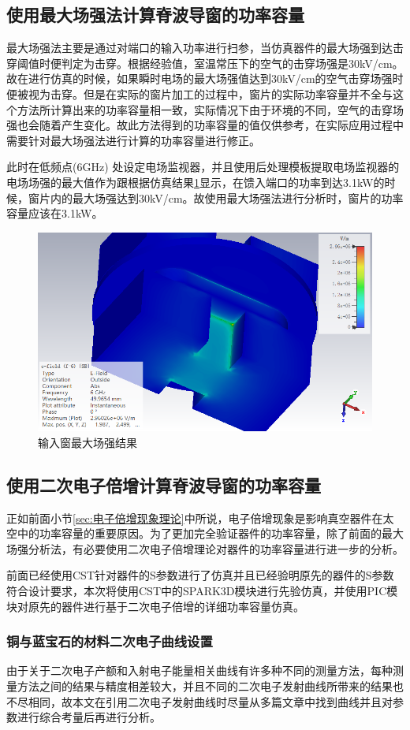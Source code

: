\documentclass[master]{thesis-uestc}
\begin{document}
\subsection{使用最大场强法计算脊波导窗的功率容量}\label{subsec:X最大场强功率容量}
最大场强法主要是通过对端口的输入功率进行扫参，当仿真器件的最大场强到达击穿阈值时便判定为击穿。根据经验值，室温常压下的空气的击穿场强是30kV/cm。故在进行仿真的时候，如果瞬时电场的最大场强值达到30kV/cm的空气击穿场强时便被视为击穿。但是在实际的窗片加工的过程中，窗片的实际功率容量并不全与这个方法所计算出来的功率容量相一致，实际情况下由于环境的不同，空气的击穿场强也会随着产生变化。故此方法得到的功率容量的值仅供参考，在实际应用过程中需要针对最大场强法进行计算的功率容量进行修正。

此时在低频点(6GHz) 处设定电场监视器，并且使用后处理模板提取电场监视器的电场场强的最大值作为跟根据仿真结果\ref{fig:输入窗最大场强结果}显示，在馈入端口的功率到达3.1kW的时候，窗片内的最大场强达到30kV/cm。故使用最大场强法进行分析时，窗片的功率容量应该在3.1kW。
\begin{figure}[!htb]
    \centering
    \includegraphics[width=0.5\linewidth]{pic/chapter3/X频段最大功率场强.png}
    \caption{输入窗最大场强结果}
    \label{fig:输入窗最大场强结果}
\end{figure}

\subsection{使用二次电子倍增计算脊波导窗的功率容量}\label{subsec:X二次电子倍增功率容量}
正如前面小节\ref{sec:电子倍增现象理论}中所说，电子倍增现象是影响真空器件在太空中的功率容量的重要原因。为了更加完全验证器件的功率容量，除了前面的最大场强分析法，有必要使用二次电子倍增理论对器件的功率容量进行进一步的分析。

前面已经使用CST针对器件的S参数进行了仿真并且已经验明原先的器件的S参数符合设计要求，本次将使用CST中的SPARK3D模块进行先验仿真，并使用PIC模块对原先的器件进行基于二次电子倍增的详细功率容量仿真。

\subsubsection{铜与蓝宝石的材料二次电子曲线设置}
由于关于二次电子产额和入射电子能量相关曲线有许多种不同的测量方法，每种测量方法之间的结果与精度相差较大，并且不同的二次电子发射曲线所带来的结果也不尽相同，故本文在引用二次电子发射曲线时尽量从多篇文章中找到曲线并且对参数进行综合考量后再进行分析。
\end{document}
